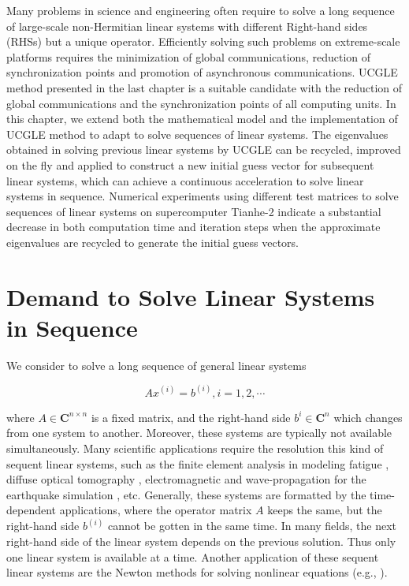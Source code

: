 \begin{displayquote}
	\textsf{Many problems in science and engineering often require to solve a long sequence of large-scale non-Hermitian linear systems with different Right-hand sides (RHSs) but a unique operator. Efficiently solving such problems on extreme-scale platforms requires the minimization of global communications, reduction of synchronization points and promotion of asynchronous communications. UCGLE method presented in the last chapter is a suitable candidate with the reduction of global communications and the synchronization points of all computing units. In this chapter, we extend both the mathematical model and the implementation of UCGLE method to adapt to solve sequences of linear systems. The eigenvalues obtained in solving previous linear systems by UCGLE can be recycled, improved on the fly and applied to construct a new initial guess vector for subsequent linear systems, which can achieve a continuous acceleration to solve linear systems in sequence. Numerical experiments using different test matrices to solve sequences of linear systems on supercomputer Tianhe-2 indicate a substantial decrease in both computation time and iteration steps when the approximate eigenvalues are recycled to generate the initial guess vectors.}
\end{displayquote}
 
\vspace{0.6in}

\section{Demand to Solve Linear Systems in Sequence}

We consider to solve a long sequence of general linear systems 

\begin{equation}
Ax^{(i)}=b^{(i)}, i=1,2,\cdots
\end{equation}

where $A \in \mathbf{C}^{n\times n}$ is a fixed matrix, and the right-hand side $b^{i} \in \mathbf{C}^n$ which changes from one system to another. Moreover, these systems are typically not available simultaneously. Many scientific applications require the resolution this kind of sequent linear systems, such as the finite element analysis in modeling fatigue \cite{newman1976finite, gullerud2001mpi,sukumar2003extended}, diffuse optical tomography \cite{kilmer2006recycling,arridge1993finite,schweiger1995finite}, electromagnetic \cite{bastos2003electromagnetic,pridmore1981investigation, ye2008generalized} and wave-propagation for the earthquake simulation \cite{Fujita:2018:WPS:3149457.3149474,moczo2007finite,chen2015transient}, etc. Generally, these systems are formatted by the time-dependent applications, where the operator matrix $A$ keeps the same, but the right-hand side $b^{(i)}$ cannot be gotten in the same time. In many fields, the next right-hand side of the linear system depends on the previous solution. Thus only one linear system is available at a time. Another application of these sequent linear systems are the Newton methods for solving nonlinear equations (e.g., \cite{brown1990hybrid,knoll2004jacobian,bellavia2001globally,flueck1998solving,an2007globally}). 

